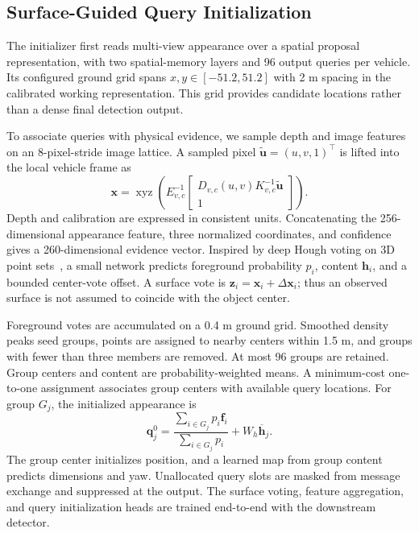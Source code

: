 \subsection{Surface-Guided Query Initialization}
The initializer first reads multi-view appearance over a spatial proposal representation, with two spatial-memory layers and 96 output queries per vehicle. Its configured ground grid spans $x,y\in[-51.2,51.2]$ with 2 m spacing in the calibrated working representation. This grid provides candidate locations rather than a dense final detection output.

To associate queries with physical evidence, we sample depth and image features on an 8-pixel-stride image lattice. A sampled pixel $\tilde{\mathbf u}=(u,v,1)^\top$ is lifted into the local vehicle frame as
\begin{equation}
 \mathbf x=\operatorname{xyz}\!\left(E_{v,c}^{-1}
 \begin{bmatrix}D_{v,c}(u,v)K_{v,c}^{-1}\tilde{\mathbf u}\\1\end{bmatrix}\right).
\end{equation}
Depth and calibration are expressed in consistent units. Concatenating the 256-dimensional appearance feature, three normalized coordinates, and confidence gives a 260-dimensional evidence vector. Inspired by deep Hough voting on 3D point sets~\cite{votenet}, a small network predicts foreground probability $p_i$, content $\mathbf h_i$, and a bounded center-vote offset. A surface vote is $\mathbf z_i=\mathbf x_i+\Delta\mathbf x_i$; thus an observed surface is not assumed to coincide with the object center.

Foreground votes are accumulated on a 0.4 m ground grid. Smoothed density peaks seed groups, points are assigned to nearby centers within 1.5 m, and groups with fewer than three members are removed. At most 96 groups are retained. Group centers and content are probability-weighted means. A minimum-cost one-to-one assignment associates group centers with available query locations. For group $G_j$, the initialized appearance is
\begin{equation}
 \mathbf q_j^0=\frac{\sum_{i\in G_j}p_i\mathbf f_i}{\sum_{i\in G_j}p_i}
 +W_h\overline{\mathbf h}_j.
\end{equation}
The group center initializes position, and a learned map from group content predicts dimensions and yaw. Unallocated query slots are masked from message exchange and suppressed at the output. The surface voting, feature aggregation, and query initialization heads are trained end-to-end with the downstream detector.

